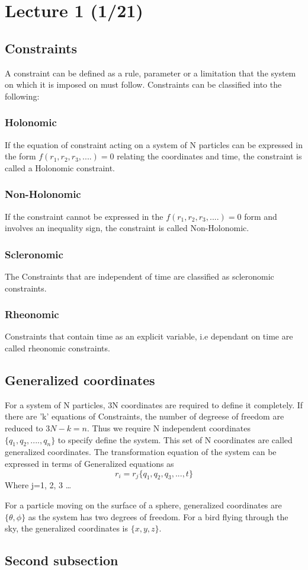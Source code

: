 
\section[Lecture 1 (Date) -- {\it Basic Concepts}]{Lecture 1 (1/21)}

\subsection{Constraints}
A constraint can be defined as a rule, parameter or a limitation that the system on which it is imposed
on must follow. Constraints can be classified into the following: 
    \subsubsection{Holonomic}
    If the equation of constraint acting on a system of N particles can be expressed in the form $f(r_{1}, r_{2}, r_{3},....)=0$
    relating the coordinates and time, the constraint is called a Holonomic constraint. 
    \subsubsection{Non-Holonomic}
    If the constraint cannot be expressed in the $f(r_{1}, r_{2}, r_{3},....)=0$ form and involves
    an inequality sign, the constraint is called Non-Holonomic.
    \subsubsection{Scleronomic}
    The Constraints that are independent of time are classified as scleronomic constraints.
    \subsubsection{Rheonomic}
    Constraints that contain time as an explicit variable, i.e dependant on time are called rheonomic constraints.
\subsection{Generalized coordinates}
For a system of N particles, 3N coordinates are required to define it completely. If there are 'k' equations of Constraints, the 
number of degreese of freedom are reduced to $3N-k=n$. Thus we require N independent coordinates $\{q_{1}, q_{2}, .... , q_{n}\}$
to specify define the system. This set of N coordinates are called generalized coordinates. The transformation equation of the 
system can be expressed in terms of Generalized equations as 
$$r_{i}=r_{j}\{q_{1}, q_{2}, q_{3}, ... , t\}$$ 
Where j=1, 2, 3 \dots

For a particle moving on the surface of a sphere, generalized coordinates are $\{\theta, \phi\}$ as the system has two degrees of freedom.
For a bird flying through the sky, the generalized coordinates is $\{x, y, z\}$. 

\subsection{Second subsection}